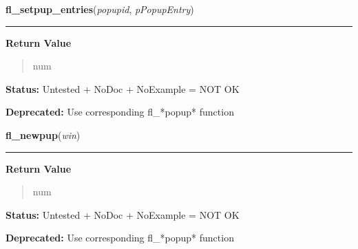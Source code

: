     \label{xformslib:library:fl_setpup_entries}

    \vspace{0.5ex}

\hspace{.8\funcindent}\begin{boxedminipage}{\funcwidth}

    \raggedright \textbf{fl\_setpup\_entries}(\textit{popupid}, \textit{pPopupEntry})

    \vspace{-1.5ex}

    \rule{\textwidth}{0.5\fboxrule}
\setlength{\parskip}{2ex}
\setlength{\parskip}{1ex}
      \textbf{Return Value}
    \vspace{-1ex}

      \begin{quote}
      num

      \end{quote}

\textbf{Status:} Untested + NoDoc + NoExample = NOT OK



\textbf{Deprecated:} Use corresponding fl\_*popup* function



    \end{boxedminipage}

    \label{xformslib:library:fl_newpup}

    \vspace{0.5ex}

\hspace{.8\funcindent}\begin{boxedminipage}{\funcwidth}

    \raggedright \textbf{fl\_newpup}(\textit{win})

    \vspace{-1.5ex}

    \rule{\textwidth}{0.5\fboxrule}
\setlength{\parskip}{2ex}
\setlength{\parskip}{1ex}
      \textbf{Return Value}
    \vspace{-1ex}

      \begin{quote}
      num

      \end{quote}

\textbf{Status:} Untested + NoDoc + NoExample = NOT OK



\textbf{Deprecated:} Use corresponding fl\_*popup* function



    \end{boxedminipage}

